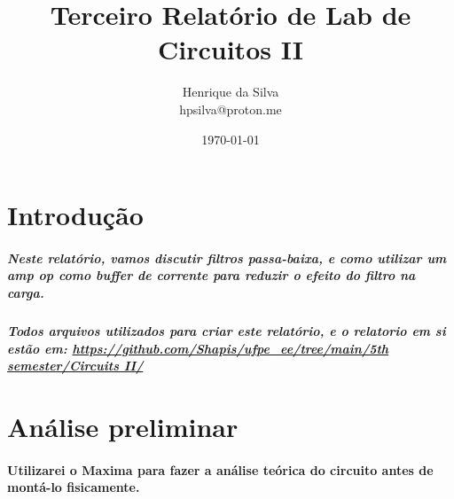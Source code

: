 \documentclass[12pt,twoside, a4paper, twocolumn]{article}
\title{Terceiro Relatório de Lab de Circuitos II}
\author{Henrique da Silva \\ hpsilva@proton.me}
\date{\today}
\begin{document}
\maketitle
{}
\newpage
\tableofcontents
\newpage




\section{Introdução}








\subparagraph*{Neste relatório, vamos discutir filtros passa-baixa, e como utilizar um amp op como buffer de corrente para reduzir o efeito do filtro na carga.}








\subparagraph*{Todos arquivos utilizados para criar este relatório, e o relatorio em si estão em:  \url{https://github.com/Shapis/ufpe_ee/tree/main/5th semester/Circuits II/}}
































\section{Análise preliminar}








\paragraph*{Utilizarei o Maxima para fazer a análise teórica do circuito antes de montá-lo fisicamente.}
\end{document}
